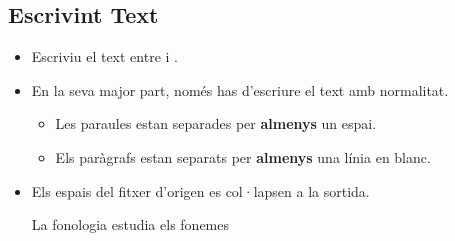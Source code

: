 \documentclass{beamer}
\begin{document}
\subsection{Escrivint Text}
\begin{frame}[fragile]{\insertsubsection{}}
\small
\begin{itemize}
\item Escriviu el text entre  i .
\item En la seva major part, només has d'escriure el text amb normalitat.

\begin{itemize}
    \item Les paraules estan separades per \textbf{almenys} un espai.
    \item Els paràgrafs estan separats per \textbf{almenys} una línia en blanc.
\end{itemize}

\item Els espais del fitxer d'origen es col·lapsen a la sortida. 
\begin{exampletwouptiny}
La          fonologia
    estudia els fonemes 
\end{exampletwouptiny}
\end{itemize}
\end{frame}
\end{document}
